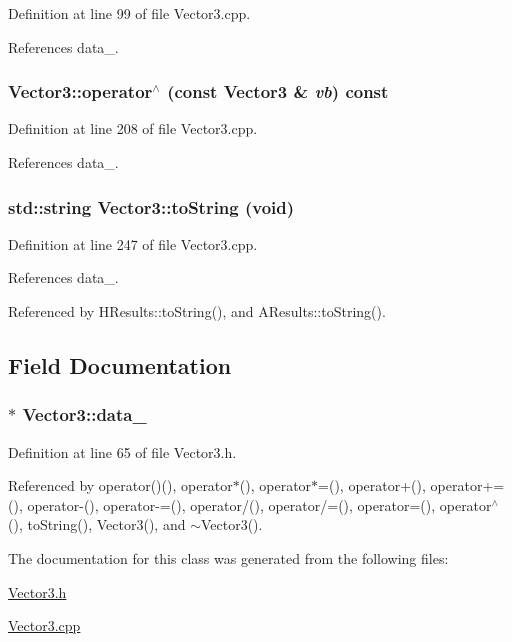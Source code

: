 Definition at line 99 of file Vector3.cpp.



References data\_\-.

\subsubsection[{operator$^\wedge$}]{ Vector3::operator$^\wedge$ (const {\bf Vector3} \& {\em vb}) const}\label{classVector3_a1e8229da8ceab6b2c04173ca97dfea34}


Definition at line 208 of file Vector3.cpp.



References data\_\-.

\subsubsection[{toString}]{\setlength{\rightskip}{0pt plus 5cm}std::string Vector3::toString (void)}\label{classVector3_a5e8931f972f8768480d28a9e9ed44b5f}


Definition at line 247 of file Vector3.cpp.



References data\_\-.



Referenced by HResults::toString(), and AResults::toString().



\subsection{Field Documentation}
\subsubsection[{data\_\-}]{$\ast$ {\bf Vector3::data\_\-}}\label{classVector3_acb3d1e96d07b66586a7f78a79d9a8996}


Definition at line 65 of file Vector3.h.



Referenced by operator()(), operator$\ast$(), operator$\ast$=(), operator+(), operator+=(), operator-\/(), operator-\/=(), operator/(), operator/=(), operator=(), operator$^\wedge$(), toString(), Vector3(), and $\sim$Vector3().



The documentation for this class was generated from the following files:\begin{DoxyCompactItemize}
\item 
\hyperlink{Vector3_8h}{Vector3.h}\item 
\hyperlink{Vector3_8cpp}{Vector3.cpp}\end{DoxyCompactItemize}
